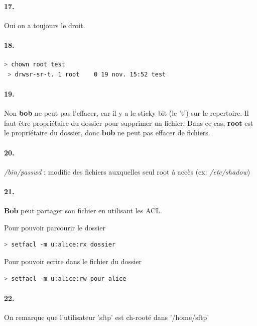 \documentclass[10pt]{article}
\begin{document}
        \paragraph{17.}
        Oui on a toujours le droit.
        
        \paragraph{18.}
 \begin{lstlisting}[language=bash]
 > chown root test
 > drwsr-sr-t. 1 root    0 19 nov. 15:52 test
\end{lstlisting}

        \paragraph{19.}
        Non \textbf{bob} ne peut pas l'effacer, car il y a le sticky bit (le 't') sur le repertoire.
        Il faut être propriétaire du dossier pour supprimer un fichier.
        Dans ce cas, \textbf{root} est le propriétaire du dossier, donc \textbf{bob} ne peut pas effacer de fichiers.
        
        \paragraph{20.}
        \textit{/bin/passwd} : modifie des fichiers auxquelles seul root à accès (ex: \textit{/etc/shadow})
        
        \paragraph{21.}
        \textbf{Bob} peut partager son fichier en utilisant les ACL.
        
        Pour pouvoir parcourir le dossier
\begin{lstlisting}[language=bash]
> setfacl -m u:alice:rx dossier
\end{lstlisting}

Pour pouvoir ecrire dans le fichier du dossier
\begin{lstlisting}[language=bash]
> setfacl -m u:alice:rw pour_alice
\end{lstlisting}
 
 \paragraph{22.}
 On remarque que l'utilisateur 'sftp' est ch-rooté dans '/home/sftp'
\end{document}
